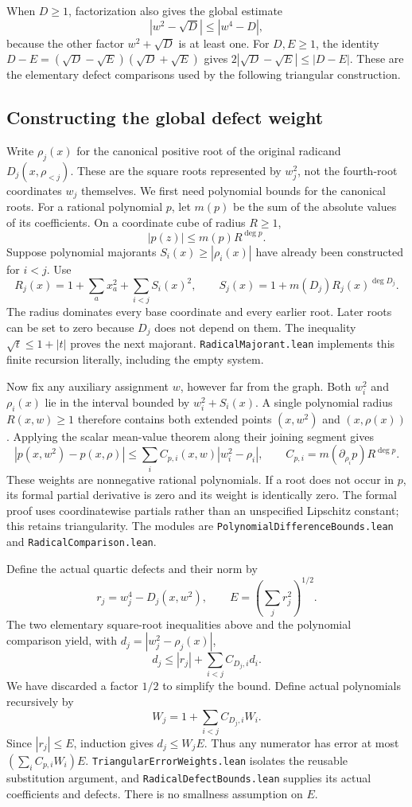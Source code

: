 \documentclass[11pt]{article}
\newcommand{\code}[1]{{\small\nolinkurl{#1}}}
\begin{document}
When $D\ge1$, factorization also gives the global estimate
\[
 |w^2-\sqrt D|\le|w^4-D|,
\]
because the other factor $w^2+\sqrt D$ is at least one. For $D,E\ge1$,
the identity $D-E=(\sqrt D-\sqrt E)(\sqrt D+\sqrt E)$ gives
$2|\sqrt D-\sqrt E|\le|D-E|$. These are the elementary defect
comparisons used by the following triangular construction.

\subsection{Constructing the global defect weight}

Write $\rho_j(x)$ for the canonical positive root of the original
radicand $D_j(x,\rho_{<j})$. These are the square roots represented by
$w_j^2$, not the fourth-root coordinates $w_j$ themselves. We first need
polynomial bounds for the canonical roots. For a rational polynomial
$p$, let $m(p)$ be the sum of the absolute values of its coefficients.
On a coordinate cube of radius $R\ge1$,
\[
 |p(z)|\le m(p)R^{\deg p}.
\]
Suppose polynomial majorants $S_i(x)\ge|\rho_i(x)|$ have already been
constructed for $i<j$. Use
\[
 R_j(x)=1+\sum_a x_a^2+\sum_{i<j}S_i(x)^2,
 \qquad S_j(x)=1+m(D_j)R_j(x)^{\deg D_j}.
\]
The radius dominates every base coordinate and every earlier root.
Later roots can be set to zero because $D_j$ does not depend on them.
The inequality $\sqrt t\le1+|t|$ proves the next majorant.
\code{RadicalMajorant.lean} implements this finite recursion literally,
including the empty system.

Now fix any auxiliary assignment $w$, however far from the graph.
Both $w_i^2$ and $\rho_i(x)$ lie in the interval bounded by
$w_i^2+S_i(x)$. A single polynomial radius $R(x,w)\ge1$ therefore contains
both extended points $(x,w^2)$ and $(x,\rho(x))$. Applying the scalar
mean-value theorem along their joining segment gives
\[
 |p(x,w^2)-p(x,\rho)|
 \le\sum_i C_{p,i}(x,w)|w_i^2-\rho_i|,
 \qquad C_{p,i}=m(\partial_{\rho_i}p)R^{\deg p}.
\]
These weights are nonnegative rational polynomials. If a root does not
occur in $p$, its formal partial derivative is zero and its weight is
identically zero. The formal proof uses coordinatewise partials rather
than an unspecified Lipschitz constant; this retains triangularity.
The modules are \code{PolynomialDifferenceBounds.lean} and
\code{RadicalComparison.lean}.

Define the actual quartic defects and their norm by
\[
 r_j=w_j^4-D_j(x,w^2),\qquad E=\left(\sum_jr_j^2\right)^{1/2}.
\]
The two elementary square-root inequalities above and the polynomial
comparison yield, with $d_j=|w_j^2-\rho_j(x)|$,
\[
 d_j\le |r_j|+\sum_{i<j}C_{D_j,i}d_i.
\]
We have discarded a factor $1/2$ to simplify the bound. Define actual
polynomials recursively by
\[
 W_j=1+\sum_{i<j}C_{D_j,i}W_i.
\]
Since $|r_j|\le E$, induction gives $d_j\le W_jE$. Thus any numerator
has error at most $(\sum_iC_{p,i}W_i)E$.
\code{TriangularErrorWeights.lean} isolates the reusable substitution
argument, and \code{RadicalDefectBounds.lean} supplies its actual
coefficients and defects. There is no smallness assumption on $E$.
\end{document}
